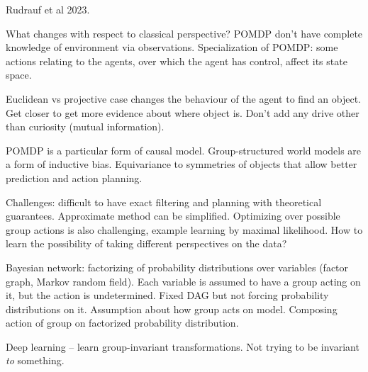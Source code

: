 Rudrauf et al 2023.

What changes with respect to classical perspective?
POMDP don't have complete knowledge of environment via observations.
Specialization of POMDP: some actions relating to the agents, over which the agent has
control, affect its state space.

Euclidean vs projective case changes the behaviour of the agent to find an object.
Get closer to get more evidence about where object is.
Don't add any drive other than curiosity (mutual information).

POMDP is a particular form of causal model.
Group-structured world models are a form of inductive bias.
Equivariance to symmetries of objects that allow better prediction and action planning.

Challenges: difficult to have exact filtering and planning with theoretical guarantees.
Approximate method can be simplified.
Optimizing over possible group actions is also challenging, example learning by maximal
likelihood.
How to learn the possibility of taking different perspectives on the data?

Bayesian network: factorizing of probability distributions over variables (factor
graph, Markov random field).
Each variable is assumed to have a group acting on it, but the action is undetermined.
Fixed DAG but not forcing probability distributions on it.
Assumption about how group acts on model.
Composing action of group on factorized probability distribution.

Deep learning -- learn group-invariant transformations.
Not trying to be invariant \emph{to} something.

